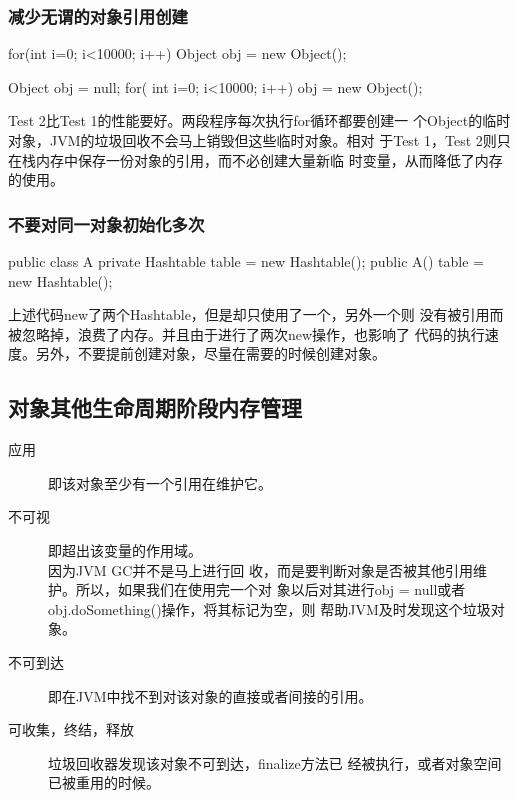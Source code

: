 \subsubsection{减少无谓的对象引用创建}


\begin{javaCode}
  for(int i=0; i<10000; i++) {
    Object obj = new Object(); 
  }
\end{javaCode}


\begin{javaCode}
  Object obj = null; 
  for( int i=0; i<10000; i++) {
    obj = new Object(); 
  }
\end{javaCode}

  
{\small\kai Test 2比Test 1的性能要好。两段程序每次执行for循环都要创建一
  个Object的临时对象，JVM的垃圾回收不会马上销毁但这些临时对象。相对
  于Test 1，Test 2则只在栈内存中保存一份对象的引用，而不必创建大量新临
  时变量，从而降低了内存的使用。}


\subsubsection{不要对同一对象初始化多次}

\begin{javaCode}
  public class A { 
    private Hashtable table = new Hashtable(); 
    public A() { 
      table = new Hashtable();
    }
  }
\end{javaCode}


{\small\kai 上述代码new了两个Hashtable，但是却只使用了一个，另外一个则
  没有被引用而被忽略掉，浪费了内存。并且由于进行了两次new操作，也影响了
  代码的执行速度。另外，不要提前创建对象，尽量在需要的时候创建对象。}

\subsection{对象其他生命周期阶段内存管理}

\begin{description}
\item[应用] 即该对象至少有一个引用在维护它。
\item[不可视] 即超出该变量的作用域。\\{\kai 因为JVM GC并不是马上进行回
    收，而是要判断对象是否被其他引用维护。所以，如果我们在使用完一个对
    象以后对其进行obj = null或者obj.doSomething()操作，将其标记为空，则
    帮助JVM及时发现这个垃圾对象。}
\item[不可到达] 即在JVM中找不到对该对象的直接或者间接的引用。
\item[可收集，终结，释放] 垃圾回收器发现该对象不可到达，finalize方法已
  经被执行，或者对象空间已被重用的时候。
\end{description}

